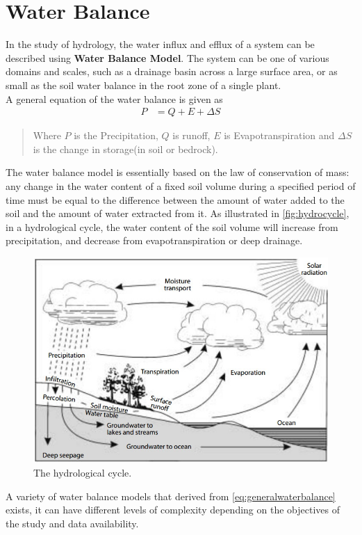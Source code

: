 
\chapter{Water Balance} %

\label{ch:WaterBalance} %

In the study of hydrology, the water influx and efflux of a system can be described using \textbf{Water Balance Model}. The system can be one of various domains and scales, such as a drainage basin across a large surface area\citep{Kirby2008}, or as small as the soil water balance in the root zone of a single plant\citep{Zhang2002}.\\
\newline
A general equation of the water balance is given as
\begin{align}
P&=Q+E+\Delta S\label{eq:generalwaterbalance}
\end{align}
\begin{quote}Where $P$ is the Precipitation, $Q$ is runoff, $E$ is Evapotranspiration and $\Delta S$ is the change in storage(in soil or bedrock).
\end{quote}
The water balance model is essentially based on the law of conservation of mass: any change in the water content of a fixed soil volume during a specified period of time must be equal to the difference between the amount of water added to the soil and the amount of water extracted from it. As illustrated in \autoref{fig:hydrocycle}, in a hydrological cycle, the water content of the soil volume will increase from precipitation, and decrease from evapotranspiration or deep drainage.
\begin{figure}[bth]
\begin{center}
\includegraphics[width=.85\linewidth]{gfx/hydrocycle}
\end{center}
\caption{The hydrological cycle\citep{Zhang2002}.}
\label{fig:hydrocycle}
\end{figure}
\newline
A variety of water balance models that derived from \autoref{eq:generalwaterbalance} exists, it can have different levels of complexity depending on the objectives of the study and data availability. 
